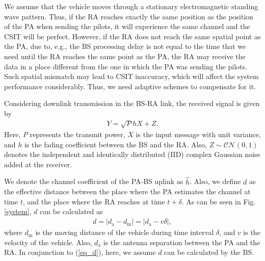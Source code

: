 We assume that the vehicle moves through a stationary electromagnetic standing wave pattern. Thus, if the RA reaches exactly the same position as the position of the PA when sending the pilots, it will experience the same channel and the CSIT will be perfect. However, if the RA does not reach the same spatial point as the PA, due to, e.g., the BS processing delay is not equal to the time that we need until the RA reaches the same point as the PA, the RA may receive the data in a place different from the one in which the PA was sending the pilots. Such spatial mismatch may lead to CSIT inaccuracy, which will affect the system performance considerably. Thus, we need adaptive schemes to compensate for it.

Considering downlink transmission in the BS-RA link, the received signal is given by
\begin{align}\label{eq_Y}
{{Y}} = \sqrt{P}hX + Z.
\end{align}
Here, $P$ represents the transmit power, $X$ is the input message with unit variance, and $h$ is the fading coefficient between the BS and the RA. Also, $Z \sim \mathcal{CN}(0,1)$ denotes the independent and identically distributed (IID) complex Gaussian noise added at the receiver.



We denote the channel coefficient of the PA-BS uplink as $\hat{h}$. Also, we define $d$ as the effective distance between  the place where the PA estimates the channel at time $t$, and the place where the RA reaches at time $t+\delta$. As can be seen in Fig. \ref{system}, $d$ can be calculated as
\begin{align}\label{eq_d}
    d = |d_\text{a} - d_\text{m} | = |d_\text{a} - v\delta|,
\end{align}
where $d_\text{m}$ is the moving distance of the vehicle during time interval $\delta$, and $v$ is the velocity of the vehicle. Also, $d_\text{a}$ is the antenna separation between the PA and the RA. In conjunction to (\ref{eq_d}), here, we assume $d$ can be calculated by the BS. 

